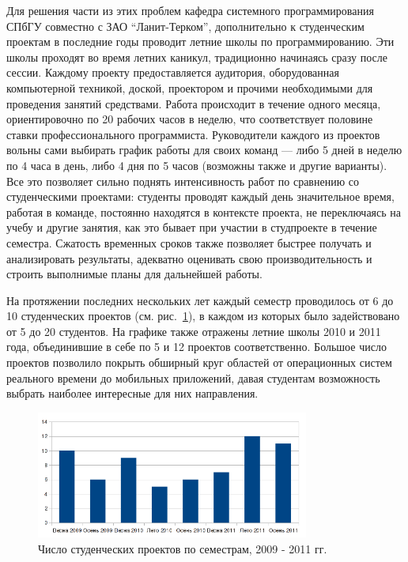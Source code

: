 \documentclass[a4paper]{article}
\begin{document}
Для решения части из этих проблем кафедра системного программирования СПбГУ совместно с ЗАО ``Ланит-Терком'', дополнительно к студенческим проектам в последние годы проводит летние школы по программированию. Эти школы проходят во время летних каникул, традиционно начинаясь сразу после сессии. Каждому проекту предоставляется аудитория, оборудованная компьютерной техникой, доской, проектором и прочими необходимыми для проведения занятий средствами. Работа происходит в течение одного месяца, ориентировочно по 20 рабочих часов в неделю, что соответствует половине ставки профессионального программиста. Руководители каждого из проектов вольны сами выбирать график работы для своих команд ---  либо 5 дней в неделю по 4 часа в день, либо 4 дня по 5 часов (возможны также и другие варианты). Все это позволяет сильно поднять интенсивность работ по сравнению со студенческими проектами: студенты проводят каждый день значительное время, работая в команде, постоянно находятся в контексте проекта, не переключаясь на учебу и другие занятия, как это бывает при участии в студпроекте в течение семестра. Сжатость временных сроков также позволяет быстрее получать и анализировать результаты, адекватно оценивать свою производительность и строить выполнимые планы для дальнейшей работы. 

На протяжении последних нескольких лет каждый семестр проводилось от 6 до 10 студенческих проектов (см. рис.~\ref{projects}), в каждом из которых было задействовано от 5 до 20 студентов. На графике также отражены летние школы 2010 и 2011 года, объединившие в себе по 5 и 12 проектов соответственно. Большое число проектов позволило покрыть обширный круг областей от операционных систем реального времени до мобильных приложений, давая студентам возможность выбрать наиболее интересные для них направления.

\begin{figure} [ht]
  \begin{center}
    \includegraphics[width=0.8\textwidth]{01-projects.png}
    \caption{Число студенческих проектов по семестрам, 2009 - 2011 гг.}
    \label{projects}
  \end{center}
\end{figure}
\end{document}
